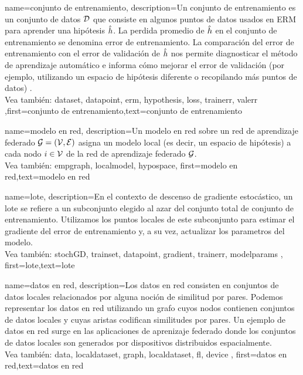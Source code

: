  {name={conjunto de entrenamiento},
 description={Un conjunto de entrenamiento es un conjunto de datos $\mathcal{D}$ que consiste en algunos puntos de datos usados en ERM
	 para aprender una hipótesis $\hat{h}$. La perdida promedio de $\hat{h}$ en el 
	 conjunto de entrenamiento se denomina error de entrenamiento.  La comparación del error de entrenamiento con el 
	 error de validación de $\hat{h}$ nos permite diagnosticar el método de aprendizaje automático e informa cómo mejorar 
	 el error de validación (por ejemplo, utilizando un espacio de hipótesis diferente o recopilando más puntos de datos) \cite[Sec. 6.6]{MLBasics}.
	 \\
	 Vea también: \gls{dataset}, \gls{datapoint}, \gls{erm}, \gls{hypothesis}, \gls{loss}, \gls{trainerr}, \gls{valerr}}
	 ,first={conjunto de entrenamiento},text={conjunto de entrenamiento}  
 }
 
 {name={modelo en red},
   description={Un modelo en red sobre un red de aprendizaje federado $\mathcal{G} = \left( \mathcal{V},\mathcal{E} \right)$ asigna 
	un modelo local (es decir, un espacio de hipótesis) a cada nodo $i \in \mathcal{V}$ de la red de aprendizaje federado $\mathcal{G}$.
	\\
	 Vea también: \gls{empgraph}, \gls{localmodel}, \gls{hypospace}}, 
	first={modelo en red},text={modelo en red}
 }

 {
	 name={lote},
	 description={En el contexto de descenso de gradiente estocástico, un lote se refiere a un subconjunto elegido al azar del 
	 conjunto total de conjunto de entrenamiento. Utilizamos los puntos locales de este subconjunto 
	 para estimar el gradiente del error de entrenamiento y, a su vez, actualizar los parametros del modelo.
	 \\
	 Vea también: \gls{stochGD}, \gls{trainset}, \gls{datapoint}, \gls{gradient}, \gls{trainerr}, \gls{modelparams} }, 
	 first={lote},text={lote}  
 }
 
 {
	 name={datos en red},
	 description={Los datos en red consisten en conjuntos de datos locales 
	 relacionados por alguna noción de similitud por pares. Podemos representar los datos en red 
	 utilizando un grafo cuyos nodos contienen conjuntos de datos locales y cuyas aristas codifican 
	 similitudes por pares. Un ejemplo de datos en red surge en las aplicaciones de aprenizaje federado
	 donde los conjuntos de datos locales son generados por dispositivos distribuidos espacialmente.
	 \\
	 Vea también: \gls{data}, \gls{localdataset}, \gls{graph}, \gls{localdataset}, \gls{fl}, \gls{device} }, 
	 first={datos en red},text={datos en red}  
 }
 
